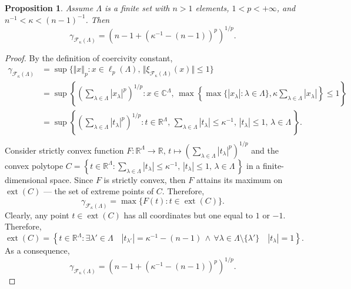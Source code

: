 \documentclass[12pt]{article}
\newtheorem{proposition}[theorem]{Proposition}
\begin{document}
\begin{proposition}\label{StdEmbdSpclCoerciv}
    Assume $\Lambda$ is a finite set with $n>1$ elements, $1<p<+\infty$, 
    and $n^{-1}<\kappa<(n-1)^{-1}$. Then
    \[
        \gamma_{\mathcal{F}_{\kappa}(\Lambda)}
        =(n-1+(\kappa^{-1}-(n-1))^p)^{1/p}.
    \]
\end{proposition}
\begin{proof}
    By the definition of coercivity constant,
    \[
    \begin{aligned}
        \gamma_{\mathcal{F}_{\kappa}(\Lambda)}
        &=\sup\{
            \Vert x\Vert_p : 
            x\in\ell_p(\Lambda),\, 
            \Vert \xi_{\mathcal{F}_{\kappa}(\Lambda)}(x)\Vert\leq 1
        \} \\
        &=\sup\left\{
            \left( \sum_{\lambda\in\Lambda} |x_\lambda|^p\right)^{1/p} : 
            x\in\mathbb{C}^\Lambda,\, 
            \max\left\{
                \max\{|x_\lambda|:\lambda\in\Lambda\},
                \kappa\sum_{\lambda\in\Lambda} |x_\lambda|
            \right\}\leq 1
        \right\} \\
        &=\sup\left\{
            \left( \sum_{\lambda\in\Lambda} |t_\lambda|^p\right)^{1/p} : 
            t\in\mathbb{R}^\Lambda,\, 
            \sum_{\lambda\in\Lambda} |t_\lambda|\leq \kappa^{-1},\,
            |t_\lambda|\leq 1,\,\lambda\in\Lambda\,
        \right\}. \\
    \end{aligned}
    \]
    Consider strictly convex function
    $
        F:
        \mathbb{R}^\Lambda\to\mathbb{R},\, 
        t\mapsto \left(\sum_{\lambda\in\Lambda}|t_\lambda|^p\right)^{1/p}
    $
    and the convex polytope
    $
        C=\left\{ 
            t\in\mathbb{R}^\Lambda : 
            \sum_{\lambda\in\Lambda} |t_\lambda|\leq \kappa^{-1},\,
            |t_\lambda|\leq 1,\,\lambda\in\Lambda\,
        \right\}
    $
    in a finite-dimensional space. Since $F$ is strictly convex, then $F$ 
    attains its maximum on $\operatorname{ext}(C)$ --- the set of extreme 
    points of $C$. Therefore,
    \[
        \gamma_{\mathcal{F}_{\kappa}(\Lambda)}=\max\{
            F(t):t\in\operatorname{ext}(C)
        \}.
    \]
    Clearly, any point $t\in \operatorname{ext}(C)$ has all coordinates but one
    equal to $1$ or $-1$. Therefore,
    $
        \operatorname{ext}(C)=\left\{ 
            t\in\mathbb{R}^\Lambda : 
            \exists \lambda'\in\Lambda\quad |t_{\lambda'}|=\kappa^{-1}-(n-1)\,
            \wedge\, 
            \forall \lambda\in\Lambda\setminus\{\lambda'\}\quad |t_\lambda|=1
        \right\}.
    $
    As a consequence,
    \[
        \gamma_{\mathcal{F}_{\kappa}(\Lambda)}=(n-1+(\kappa^{-1}-(n-1))^p)^{1/p}.
    \]
\end{proof}
\end{document}

